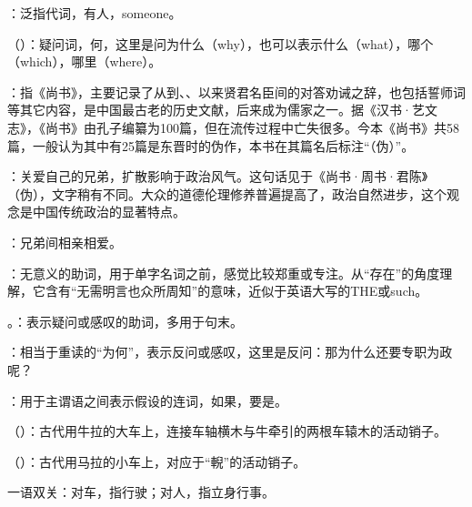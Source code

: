 {
\item {}：泛指代词，有人，someone。

\item {}（）：疑问词，何，这里是问为什么（why），也可以表示什么（what），哪个（which），哪里（where）。

\item {}：指《尚书》，主要记录了从到、、以来贤君名臣间的对答劝诫之辞，也包括誓师词等其它内容，是中国最古老的历史文献，后来成为儒家之一。据《汉书·艺文志》，《尚书》由孔子编纂为100篇，但在流传过程中亡失很多。今本《尚书》共58篇，一般认为其中有25篇是东晋时的伪作，本书在其篇名后标注“（伪）”。

\item {}：关爱自己的兄弟，扩散影响于政治风气。这句话见于《尚书·周书·君陈》（伪），文字稍有不同。大众的道德伦理修养普遍提高了，政治自然进步，这个观念是中国传统政治的显著特点。

：兄弟间相亲相爱。

：无意义的助词，用于单字名词之前，感觉比较郑重或专注。从“存在”的角度理解，它含有“无需明言也众所周知”的意味，近似于英语大写的THE或such。
\item {}。：表示疑问或感叹的助词，多用于句末。

：相当于重读的“为何”，表示反问或感叹，这里是反问：那为什么还要专职为政呢？
}
{}


{
\item {}：用于主谓语之间表示假设的连词，如果，要是。
\item {}（）：古代用牛拉的大车上，连接车轴横木与牛牵引的两根车辕木的活动销子。

（）：古代用马拉的小车上，对应于“輗”的活动销子。

\item {}一语双关：对车，指行驶；对人，指立身行事。
}
{}  %


